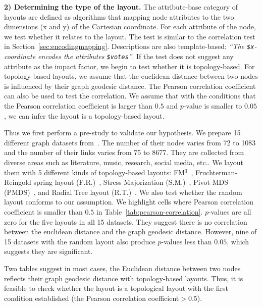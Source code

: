 \textbf{2) Determining the type of the layout.} 
The attribute-base category of layouts are defined as algorithms that mapping node attributes to the two dimensions (x and y) of the Cartesian coordinate. 
For each attribute of the node, we test whether it relates to the layout.
The test is similar to the correlation test in Section~\ref{sec:encodingmapping}.
Descriptions are also template-based: \textit{``The \texttt{\$x}-coordinate encodes the attributes \texttt{\$votes}''}.
If the test does not suggest any attribute as the impact factor, we begin to test whether it is topology-based.
For topology-based layouts, we assume that the euclidean distance between two nodes is influenced by their graph geodesic distance.
The Pearson correlation coefficient can also be used to test the correlation.
We assume that with the conditions that the Pearson correlation coefficient is larger than $0.5$ and $p$-value is smaller to $0.05$, we can infer the layout is a topology-based layout.

Thus we first perform a pre-study to validate our hypothesis.
We prepare 15 different graph datasets from~\cite{DBLP:journals/tvcg/ZhuCHHLZ21}.
The number of their nodes varies from 72 to 1083 and the number of their links varies from 75 to 8677.
They are collected from diverse areas such as literature, music, research, social media, etc..
We layout them with 5 different kinds of topology-based layouts: FM$^3$~\cite{hachul2004drawing}, Fruchterman-Reingold spring layout (F.R.)~\cite{DBLP:journals/spe/FruchtermanR91}, Stress Majorization (S.M.)~\cite{DBLP:conf/gd/GansnerKN04
}, Pivot MDS (PMDS)~\cite{DBLP:conf/gd/BrandesP06}, and Radial Tree layout (R.T.)~\cite{DBLP:conf/infovis/Jankun-KellyM03}.
We also test whether the random layout conforms to our assumption.
We highlight cells where Pearson correlation coefficient is smaller than $0.5$ in Table~\ref{tab:pearson-correlation}.
$p$-values are all zero for the five layouts in all 15 datasets.
They suggest there is no correlation between the euclidean distance and the graph geodesic distance.
However, nine of 15 datasets with the random layout also produce $p$-values less than $0.05$, which suggests they are significant.

Two tables suggest in most cases, the Euclidean distance between two nodes reflects their graph geodesic distance with topology-based layouts.
Thus, it is feasible to check whether the layout is a topological layout with the first condition established (the Pearson correlation coefficient$>0.5$).

